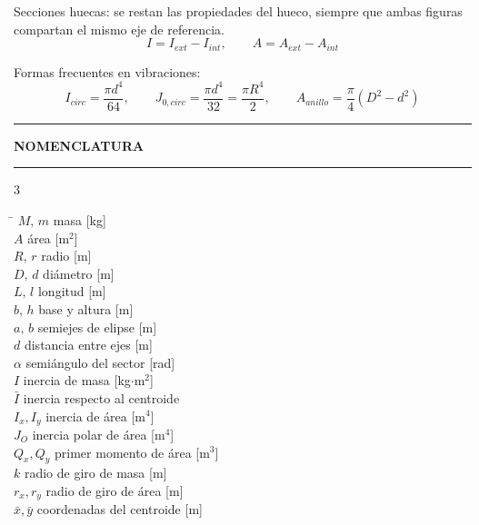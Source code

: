 \documentclass[10pt,a4paper]{article}
\newcommand{\seccion}[1]{%
  \vspace{2mm}\hrule\vspace{1mm}%
  \textbf{\footnotesize\MakeUppercase{#1}}\vspace{1mm}\hrule\vspace{2mm}}
\newcommand{\bx}{\bar{x}}
\newcommand{\by}{\bar{y}}
\begin{document}
\vspace{2mm}
Secciones huecas: se restan las propiedades del hueco, siempre que ambas figuras
compartan el mismo eje de referencia.
\begin{equation*}
  I = I_{ext} - I_{int},
  \qquad
  A = A_{ext} - A_{int}
\end{equation*}

Formas frecuentes en vibraciones:
\begin{equation*}
  I_{circ} = \frac{\pi d^{4}}{64},
  \qquad
  J_{0,circ} = \frac{\pi d^{4}}{32} = \frac{\pi R^{4}}{2},
  \qquad
  A_{anillo} = \frac{\pi}{4}\left(D^{2}-d^{2}\right)
\end{equation*}

\seccion{Nomenclatura}

\begin{multicols}{3}
\begin{tabbing}
\hspace{1.1cm}\=\kill
$M,\,m$ \> masa [kg] \\
$A$ \> área [m$^2$] \\
$R,\,r$ \> radio [m] \\
$D,\,d$ \> diámetro [m] \\
$L,\,l$ \> longitud [m] \\
$b,\,h$ \> base y altura [m] \\
$a,\,b$ \> semiejes de elipse [m] \\
$d$ \> distancia entre ejes [m] \\
$\alpha$ \> semiángulo del sector [rad] \\
$I$ \> inercia de masa [kg$\cdot$m$^2$] \\
$\bar{I}$ \> inercia respecto al centroide \\
$I_x,I_y$ \> inercia de área [m$^4$] \\
$J_O$ \> inercia polar de área [m$^4$] \\
$Q_x,Q_y$ \> primer momento de área [m$^3$] \\
$k$ \> radio de giro de masa [m] \\
$r_x,r_y$ \> radio de giro de área [m] \\
$\bx,\by$ \> coordenadas del centroide [m] \\
\end{tabbing}
\end{multicols}
\end{document}
